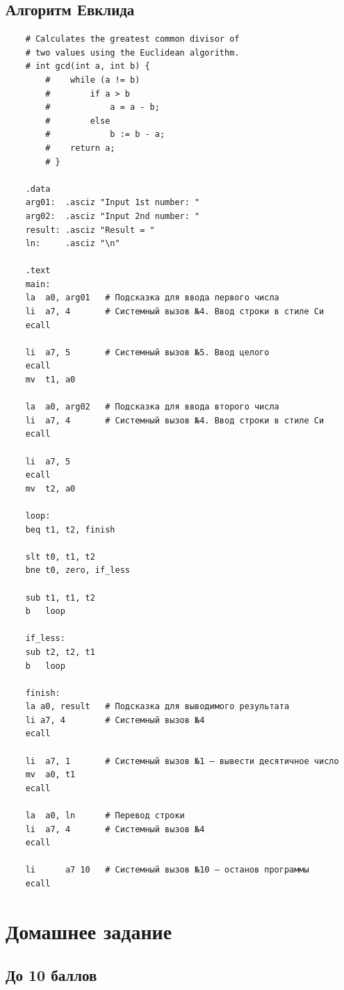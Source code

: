 \subsection{Алгоритм Евклида}
\begin{verbatim}
    # Calculates the greatest common divisor of
    # two values using the Euclidean algorithm.
    # int gcd(int a, int b) {
        #    while (a != b)
        #        if a > b
        #            a = a - b;
        #        else
        #            b := b - a;
        #    return a;
        # }

    .data
    arg01:  .asciz "Input 1st number: "
    arg02:  .asciz "Input 2nd number: "
    result: .asciz "Result = "
    ln:     .asciz "\n"

    .text
    main:
    la 	a0, arg01   # Подсказка для ввода первого числа
    li 	a7, 4       # Системный вызов №4. Ввод строки в стиле Си
    ecall

    li  a7, 5       # Системный вызов №5. Ввод целого
    ecall
    mv  t1, a0

    la 	a0, arg02   # Подсказка для ввода второго числа
    li 	a7, 4       # Системный вызов №4. Ввод строки в стиле Си
    ecall

    li  a7, 5
    ecall
    mv  t2, a0

    loop:
    beq t1, t2, finish

    slt t0, t1, t2
    bne t0, zero, if_less

    sub t1, t1, t2
    b   loop

    if_less:
    sub t2, t2, t1
    b   loop

    finish:
    la a0, result   # Подсказка для выводимого результата
    li a7, 4        # Системный вызов №4
    ecall

    li  a7, 1 		# Системный вызов №1 — вывести десятичное число
    mv  a0, t1
    ecall

    la 	a0, ln      # Перевод строки
    li  a7, 4       # Системный вызов №4
    ecall

    li      a7 10   # Системный вызов №10 — останов программы
    ecall
\end{verbatim}

\section{Домашнее задание}

\subsection{До 10 баллов}

